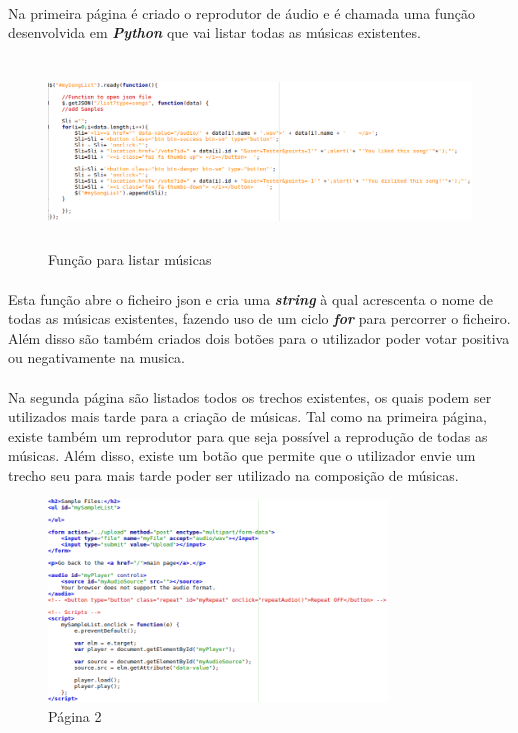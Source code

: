 \documentclass[a4paper]{report}
\begin{document}
\paragraph{}Na primeira página é criado o reprodutor de áudio e é chamada uma função desenvolvida em \textit{\textbf{Python}} que vai listar todas as músicas existentes.

\begin{figure}[H]
\center
\includegraphics[height=5cm] {imagens/page1_function}
\caption{Função para listar músicas}
\end{figure}
\paragraph{}Esta função abre o ficheiro \ac{json} e cria uma \textit{\textbf{string}} à qual acrescenta o nome de todas as músicas existentes, fazendo uso de um ciclo \textit{\textbf{for}} para percorrer o ficheiro. Além disso são também criados dois botões para o utilizador poder votar positiva ou negativamente na musica.

\newpage

\paragraph{}Na segunda página são listados todos os trechos existentes, os quais podem ser utilizados mais tarde para a criação de músicas. Tal como na primeira página, existe também um reprodutor para que seja possível a reprodução de todas as músicas. Além disso, existe um botão que permite que o utilizador envie um trecho seu para mais tarde poder ser utilizado na composição de músicas.

\begin{figure}[H]
\center
\includegraphics[width=9cm] {imagens/page2}
\caption{Página 2}
\end{figure}
\end{document}
